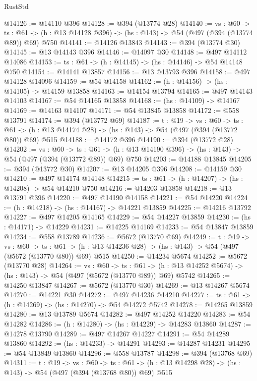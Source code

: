 \begin{lexlean}{RustStd}
\begin{coremodule}
@14126 := @14110 @396
@14128 := @394 (@13774 @28)
@14140 := {vs : @60} ->
  {ts : @61} -> (h : @13 @14128 @396) -> (hs : @143) -> @54 (@497 (@394 (@13774 @89)) @69) @750
@14141 := @14126 @13843
@14143 := @394 (@13774 @30)
@14145 := @13 @14143 @396
@14146 := @14097 @30
@14148 := @497 @14112 @14086
@14153 := {ts : @61} -> (h : @14145) -> (hs : @14146) -> @54 @14148 @750
@14154 := @14141 @13857
@14156 := @13 @13793 @396
@14158 := @497 @14128 @14096
@14159 := @54 @14158
@14162 := (h : @14156) -> (hs : @14105) -> @14159 @13858
@14163 := @14154 @13794
@14165 := @497 @14143 @14103
@14167 := @54 @14165 @13858
@14168 := (hs : @14109) -> @14167
@14169 := @14163 @14107
@14171 := @54 @13845 @13858
@14172 := @558 @13791
@14174 := @394 (@13772 @69)
@14187 := {t : @19} ->
  {vs : @60} ->
  {ts : @61} -> (h : @13 @14174 @28) -> (hs : @143) -> @54 (@497 (@394 (@13772 @80)) @69) @515
@14188 := @14172 @396
@14190 := @394 (@13772 @28)
@14202 := {vs : @60} ->
  {ts : @61} -> (h : @13 @14190 @396) -> (hs : @143) -> @54 (@497 (@394 (@13772 @89)) @69) @750
@14203 := @14188 @13845
@14205 := @394 (@13772 @30)
@14207 := @13 @14205 @396
@14208 := @14159 @30
@14210 := @497 @14174 @14148
@14215 := {ts : @61} -> (h : @14207) -> (hs : @14208) -> @54 @14210 @750
@14216 := @14203 @13858
@14218 := @13 @13791 @396
@14220 := @497 @14190 @14158
@14221 := @54 @14220
@14224 := (h : @14218) -> (hs : @14167) -> @14221 @13859
@14225 := @14216 @13792
@14227 := @497 @14205 @14165
@14229 := @54 @14227 @13859
@14230 := (hs : @14171) -> @14229
@14231 := @14225 @14169
@14233 := @54 @13847 @13859
@14234 := @558 @13789
@14236 := @5672 (@13770 @69)
@14249 := {t : @19} ->
  {vs : @60} ->
  {ts : @61} -> (h : @13 @14236 @28) -> (hs : @143) -> @54 (@497 (@5672 (@13770 @80)) @69) @515
@14250 := @14234 @5674
@14252 := @5672 (@13770 @28)
@14264 := {vs : @60} ->
  {ts : @61} -> (h : @13 @14252 @5674) -> (hs : @143) -> @54 (@497 (@5672 (@13770 @89)) @69) @5742
@14265 := @14250 @13847
@14267 := @5672 (@13770 @30)
@14269 := @13 @14267 @5674
@14270 := @14221 @30
@14272 := @497 @14236 @14210
@14277 := {ts : @61} -> (h : @14269) -> (hs : @14270) -> @54 @14272 @5742
@14278 := @14265 @13859
@14280 := @13 @13789 @5674
@14282 := @497 @14252 @14220
@14283 := @54 @14282
@14286 := (h : @14280) -> (hs : @14229) -> @14283 @13860
@14287 := @14278 @13790
@14289 := @497 @14267 @14227
@14291 := @54 @14289 @13860
@14292 := (hs : @14233) -> @14291
@14293 := @14287 @14231
@14295 := @54 @13849 @13860
@14296 := @558 @13787
@14298 := @394 (@13768 @69)
@14311 := {t : @19} ->
  {vs : @60} ->
  {ts : @61} -> (h : @13 @14298 @28) -> (hs : @143) -> @54 (@497 (@394 (@13768 @80)) @69) @515

\end{coremodule}
\end{lexlean}
